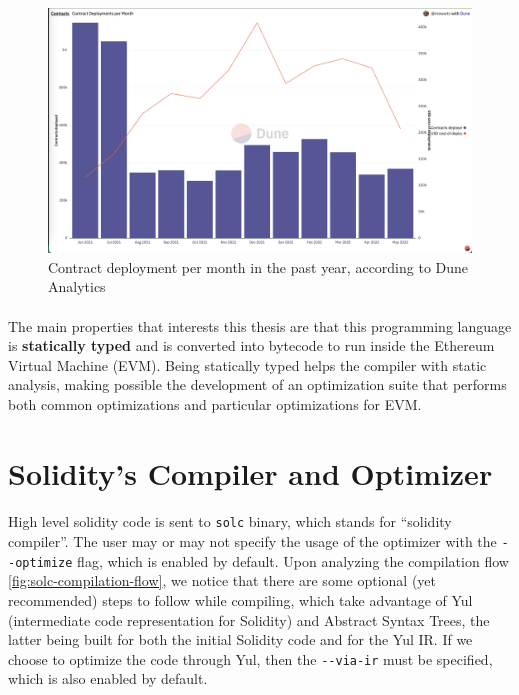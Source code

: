 \begin{figure}
    \centering
    \includegraphics[width=15cm]{images/dune_analytics_2022.png}
    \caption{Contract deployment per month in the past year, according to Dune Analytics}
    \label{fig:dune-analytics-2022}
\end{figure}

\paragraph*{}
The main properties that interests this thesis are that this programming language is \textbf{statically typed} and is converted into bytecode to run inside the Ethereum Virtual Machine (EVM). Being statically typed helps the compiler with static analysis, making possible the development of an optimization suite that performs both common optimizations and particular optimizations for EVM.

\section{Solidity's Compiler and Optimizer}
\paragraph*{}
High level solidity code is sent to \lstinline[columns=fixed]{solc} binary, which stands for ``solidity compiler''. The user may or may not specify the usage of the optimizer with the \lstinline[columns=fixed]{--optimize} flag, which is enabled by default. Upon analyzing the compilation flow \ref*{fig:solc-compilation-flow}, we notice that there are some optional (yet recommended) steps to follow while compiling, which take advantage of Yul (intermediate code representation for Solidity) and Abstract Syntax Trees, the latter being built for both the initial Solidity code and for the Yul IR. If we choose to optimize the code through Yul, then the \lstinline[columns=fixed]{--via-ir} must be specified, which is also enabled by default.

